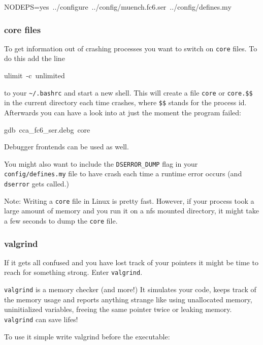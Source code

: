 \begin{lyxcode}
NODEPS=yes~../configure~../config/muench.fc6.ser~../config/defines.my
\end{lyxcode}

\subsubsection{core files}

To get information out of crashing \ccarat{} processes you want to
switch on \texttt{core} files. To do this add the line

\begin{lyxcode}
ulimit~-c~unlimited
\end{lyxcode}
to your \texttt{\textasciitilde{}/.bashrc} and start a new shell.
This will create a file \texttt{core} or \texttt{core.\$\$} in the
current directory each time \ccarat{} crashes, where \texttt{\$\$}
stands for the process id. Afterwards you can have a look into \ccarat{}
at just the moment the program failed:

\begin{lyxcode}
gdb~cca\_fc6\_ser.debg~core
\end{lyxcode}
Debugger frontends can be used as well.

You might also want to include the \texttt{DSERROR\_DUMP} flag in
your \texttt{config/defines.my} file to have \ccarat{} crash each
time a runtime error occurs (and \texttt{dserror} gets called.)

Note: Writing a \texttt{core} file in Linux is pretty fast. However,
if your process took a large amount of memory and you run it on a
nfs mounted directory, it might take a few seconds to dump the \texttt{core}
file.


\subsubsection{valgrind}

If it gets all confused and you have lost track of your pointers it
might be time to reach for something strong. Enter \texttt{valgrind}.

\texttt{valgrind} is a memory checker (and more!) It simulates your
code, keeps track of the memory usage and reports anything strange
like using unallocated memory, uninitialized variables, freeing the
same pointer twice or leaking memory. \texttt{valgrind} can save lifes!

To use it simple write valgrind before the \ccarat{} executable:

